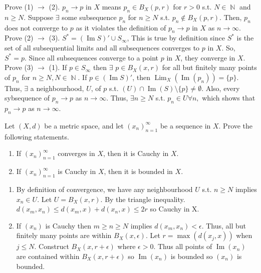 \documentclass[12pt,letterpaper,boxed]{hmcpset}
\DeclareMathOperator{\Lim}{Lim}
\DeclareMathOperator{\Img}{Im}
\DeclareMathOperator{\N}{\mathbb{N}}
\begin{document}
\begin{solution}
Prove (1) $\rightarrow$ (2). $p_n\rightarrow p$ in $X$ means $p_n \in B_X(p, r)$ for $r > 0$ s.t. $N\in\N$ and $n \ge N.$ Suppose $\exists$ some subsequence $p_n$ for $n \ge N$ s.t. $p_n \notin B_X(p, r)$. Then, $p_n$ does not converge to $p$ as it violates the definition of $p_n\rightarrow p$ in $X$ as $n\rightarrow \infty$. Prove (2) $\rightarrow$ (3). $S^{*}=(\Img S)' \cup S_{\infty}$, This is true by definition since $S^{*}$ is the set of all subsequential limits and all subsequences converges to $p$ in $X$. So, $S^{*}=p.$ Since all subsequences converge to a point $p$ in $X$, they converge in $X.$ Prove (3) $\rightarrow$ (1). If $p\in S_\infty$ then $\exists$ $p \in B_X(x,r)$ for all but finitely many points of $p_n$ for $n \ge N, N \in \N.$ If $p \in (\Img S)'$, then $\Lim_X(\Img(p_n))= \{p\}.$ Thus, $\exists$ a neighbourhood, $U$, of $p$ s.t. $(U)\cap \Img(S)\setminus\{p\}\neq\emptyset$. Also, every sybsequence of $p_n \rightarrow p$ as $n \rightarrow \infty.$ Thus, $\exists n \ge N$ s.t. $p_n \in U \forall n,$ which shows that $p_n \rightarrow p$ as $n\rightarrow \infty.$ 
\end{solution}


\begin{problem}[Exercise 2.16]
Let $(X, d)$ be a metric space, and let $(x_n)_{n=1}^{\infty}$ be a sequence in $X$. Prove the following statements.
\vspace{-2mm}
	\begin{enumerate}
		\itemsep0em
		\item If $(x_n)_{n=1}^{\infty}$ converges in $X$, then it is Cauchy in $X$.
		\item If $(x_n)_{n=1}^{\infty}$ is Cauchy in $X$, then it is bounded in $X$.
	\end{enumerate}
\end{problem}

\begin{solution}
\vspace{-1mm}
	\begin{enumerate}
		\itemsep0em
		\item By definition of convergence, we have any neighbourhood $U$ s.t. $n \ge N$ implies $x_n \in U$. Let $U=B_X(x, r)$. By the triangle inequality. $d(x_m, x_n) \leq d(x_m,x) + d(x_n, x) \leq 2r$ so Cauchy in X.
		\item If $(x_n)$ is Cauchy then $m \ge n \ge N$ implies $d(x_m, x_n) < \epsilon$. Thus, all but finitely many points are within $B_X(x, \epsilon)$. Let $r=\max(d(x_j, x))$ when $j \leq N.$ Construct $B_X(x, r + \epsilon)$ where $\epsilon > 0$. Thus all points of $\Img(x_n)$ are contained within $B_X(x, r + \epsilon)$ so $\Img(x_n)$ is bounded so $(x_n)$ is bounded.
	\end{enumerate}
\end{solution}
\end{document}
